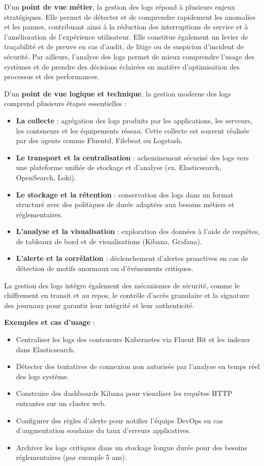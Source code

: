 D’un \textbf{point de vue métier}, la gestion des logs répond à plusieurs enjeux stratégiques. Elle permet de détecter et de comprendre rapidement les anomalies et les pannes, contribuant ainsi à la réduction des interruptions de service et à l’amélioration de l’expérience utilisateur. Elle constitue également un levier de traçabilité et de preuve en cas d’audit, de litige ou de suspicion d’incident de sécurité. Par ailleurs, l’analyse des logs permet de mieux comprendre l’usage des systèmes et de prendre des décisions éclairées en matière d’optimisation des processus et des performances.

D’un \textbf{point de vue logique et technique}, la gestion moderne des logs comprend plusieurs étapes essentielles :
\begin{itemize}
	\item \textbf{La collecte}  : agrégation des logs produits par les applications, les serveurs, les conteneurs et les équipements réseau. Cette collecte est souvent réalisée par des agents comme Fluentd, Filebeat ou Logstash.
	\item \textbf{Le transport et la centralisation}  : acheminement sécurisé des logs vers une plateforme unifiée de stockage et d’analyse (ex. Elasticsearch, OpenSearch, Loki).
	\item \textbf{Le stockage et la rétention}  : conservation des logs dans un format structuré avec des politiques de durée adaptées aux besoins métiers et réglementaires.
	\item \textbf{L’analyse et la visualisation}  : exploration des données à l’aide de requêtes, de tableaux de bord et de visualisations (Kibana, Grafana).
	\item \textbf{L’alerte et la corrélation}  : déclenchement d’alertes proactives en cas de détection de motifs anormaux ou d’événements critiques.
\end{itemize}

La gestion des logs intègre également des mécanismes de sécurité, comme le chiffrement en transit et au repos, le contrôle d’accès granulaire et la signature des journaux pour garantir leur intégrité et leur authenticité.

\textbf{Exemples et cas d’usage} :
\begin{itemize}
	\item Centraliser les logs des conteneurs Kubernetes via Fluent Bit et les indexer dans Elasticsearch.
	\item Détecter des tentatives de connexion non autorisée par l’analyse en temps réel des logs système.
	\item Construire des dashboards Kibana pour visualiser les requêtes HTTP entrantes sur un cluster web.
	\item Configurer des règles d’alerte pour notifier l’équipe DevOps en cas d’augmentation soudaine du taux d’erreurs applicatives.
	\item Archiver les logs critiques dans un stockage longue durée pour des besoins réglementaires (par exemple 5 ans).
\end{itemize}

